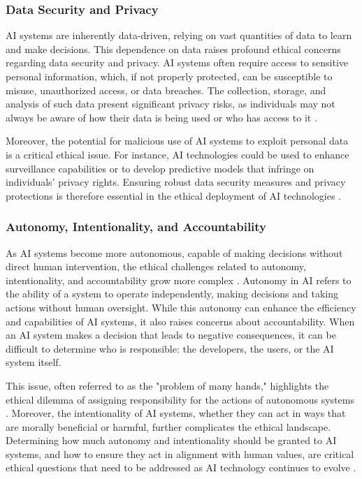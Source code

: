 \subsubsection{Data Security and Privacy}

AI systems are inherently data-driven, relying on vast quantities of data to learn and make decisions. This dependence on data raises profound ethical concerns regarding data security and privacy. AI systems often require access to sensitive personal information, which, if not properly protected, can be susceptible to misuse, unauthorized access, or data breaches. The collection, storage, and analysis of such data present significant privacy risks, as individuals may not always be aware of how their data is being used or who has access to it \cite{dilmaghani2019privacy}.

Moreover, the potential for malicious use of AI systems to exploit personal data is a critical ethical issue. For instance, AI technologies could be used to enhance surveillance capabilities or to develop predictive models that infringe on individuals' privacy rights. Ensuring robust data security measures and privacy protections is therefore essential in the ethical deployment of AI technologies \cite{huang2022overview}.

\subsubsection{Autonomy, Intentionality, and Accountability}

As AI systems become more autonomous, capable of making decisions without direct human intervention, the ethical challenges related to autonomy, intentionality, and accountability grow more complex \cite{sullins2011robot}. Autonomy in AI refers to the ability of a system to operate independently, making decisions and taking actions without human oversight. While this autonomy can enhance the efficiency and capabilities of AI systems, it also raises concerns about accountability. When an AI system makes a decision that leads to negative consequences, it can be difficult to determine who is responsible: the developers, the users, or the AI system itself.

This issue, often referred to as the "problem of many hands," highlights the ethical dilemma of assigning responsibility for the actions of autonomous systems \cite{timmermans2010ethics}. Moreover, the intentionality of AI systems, whether they can act in ways that are morally beneficial or harmful, further complicates the ethical landscape. Determining how much autonomy and intentionality should be granted to AI systems, and how to ensure they act in alignment with human values, are critical ethical questions that need to be addressed as AI technology continues to evolve \cite{huang2022overview}.

